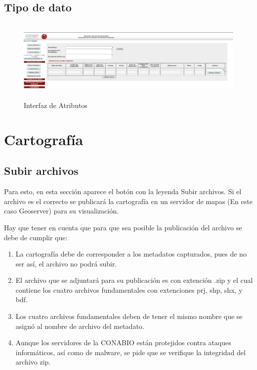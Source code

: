 \documentclass[twoside]{book}
\begin{document}
\subsection{Tipo de dato}

\begin{figure}[h!] %
	\includegraphics[width=12cm, height=4cm]{img/ambienteDeTrabajo} %
	\caption{Interfaz de Atributos}
\end{figure}


\section{Cartografía}
\subsection{Subir archivos}


Para esto, en esta sección aparece el botón con la leyenda Subir archivos. Si el archivo es el correcto se publicará la cartografía en un servidor de mapas (En este caso Geoserver) para su visualización.

Hay que tener en cuenta que para que sea posible la publicación del archivo se debe de cumplir que:
\begin{enumerate}
\item La cartografía debe de corresponder a los metadatos capturados, pues de no ser así, el archivo no podrá subir.

\item El archivo que se adjuntará para su publicación es con extención .zip y el cual contiene los cuatro archivos fundamentales con extenciones prj, shp, shx, y bdf.

\item Los cuatro archivos fundamentales deben de tener el mismo nombre que se asignó al nombre de archivo del metadato.

\item Aunque los servidores de la CONABIO están protejidos contra ataques informáticos, así como de malware, se pide que se verifique la integridad del archivo zip.

\end{enumerate}
\end{document}

